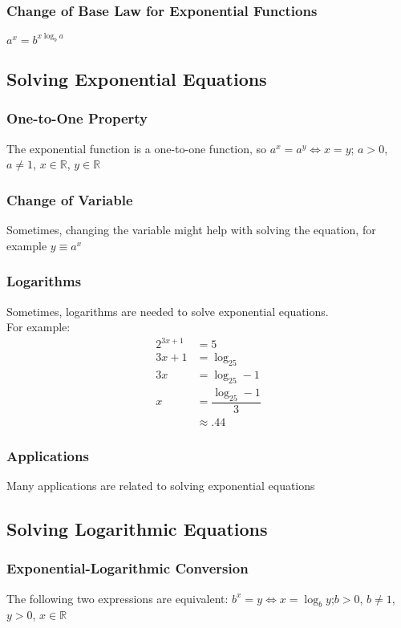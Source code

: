 \documentclass{article}
\begin{document}
	\subsubsection{Change of Base Law for Exponential Functions}
	$a^x=b^{x\log_ba}$
	\subsection{Solving Exponential Equations}
	\subsubsection{One-to-One Property}
	The exponential function is a one-to-one function, so $a^x=a^y\Leftrightarrow x=y$; $a>0$, $a\ne1$, $x\in\mathbb{R}$, $y\in\mathbb{R}$
	\subsubsection{Change of Variable}
	Sometimes, changing the variable might help with solving the equation, for example $y\equiv a^x$
	\subsubsection{Logarithms}
	Sometimes, logarithms are needed to solve exponential equations.
	\\For example:
	\begin{align*}
		2^{3x+1}&=5\\
		3x+1&=\log_25\\
		3x&=\log_25-1\\
		x&=\dfrac{\log_25-1}{3}\\
		&\approx.44
	\end{align*}
	\subsubsection{Applications}
	Many applications are related to solving exponential equations
	\subsection{Solving Logarithmic Equations}
	\subsubsection{Exponential-Logarithmic Conversion}
	The following two expressions are equivalent: $b^x=y\Leftrightarrow x=\log_by$;\hspace{2ex}$b>0$, $b\ne1$, $y>0$, $x\in\mathbb{R}$
\end{document}

